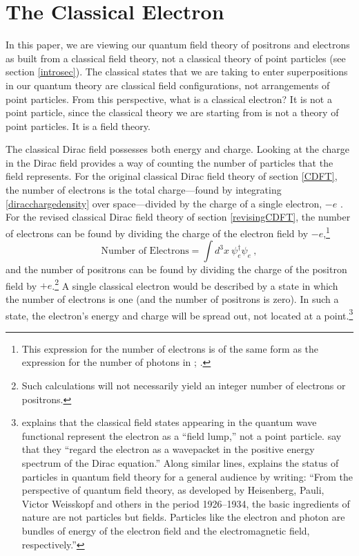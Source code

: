 \documentclass[onecolumn,secnumarabic,amsmath,amssymb,balancelastpage,nofootinbib]{article}
\begin{document}
\section{The Classical Electron}\label{minsize}

In this paper, we are viewing our quantum field theory of positrons and electrons as built from a classical field theory, not a classical theory of point particles (see section \ref{introsec}).  The classical states that we are taking to enter superpositions in our quantum theory are classical field configurations, not arrangements of point particles.  From this perspective, what is a classical electron?  It is not a point particle, since the classical theory we are starting from is not a theory of point particles.  It is a field theory.

The classical Dirac field possesses both energy and charge.  Looking at the charge in the Dirac field provides a way of counting the number of particles that the field represents.  For the original classical Dirac field theory of section \ref{CDFT}, the number of electrons is the total charge---found by integrating \eqref{diracchargedensity} over space---divided by the charge of a single electron, $-e$ \citep[pg.\ 10]{takabayasi1957}.  For the revised classical Dirac field theory of section \ref{revisingCDFT}, the number of electrons can be found by dividing the charge of the electron field by $-e$,\footnote{This expression for the number of electrons is of the same form as the expression for the number of photons in \citet[pg.\ 1918]{good1957}; \citet[sec.\ 3]{emasqp}.}
\begin{equation}
\mbox{Number of Electrons}=\int{d^3 x \ \psi_e^{\dagger} \psi_e}
\ ,
\end{equation}
and the number of positrons can be found by dividing the charge of the positron field by $+e$.\footnote{Such calculations will not necessarily yield an integer number of electrons or positrons.}  A single classical electron would be described by a state in which the number of electrons is one (and the number of positrons is zero).  In such a state, the electron's energy and charge will be spread out, not located at a point.\footnote{\citet[pg.\ 54]{valentini1992} explains that the classical field states appearing in the quantum wave functional represent the electron as a ``field lump,'' not a point particle.  \citet{chuu2007} say that they ``regard the electron as a wavepacket in the positive energy spectrum of the Dirac equation.''  Along similar lines, \citet[pg.\ 77]{weinberg2018} explains the status of particles in quantum field theory for a general audience by writing: ``From the perspective of quantum field theory, as developed by Heisenberg, Pauli, Victor Weisskopf and others in the period 1926--1934, the basic ingredients of nature are not particles but fields.  Particles like the electron and photon are bundles of energy of the electron field and the electromagnetic field, respectively.''}
\end{document}
